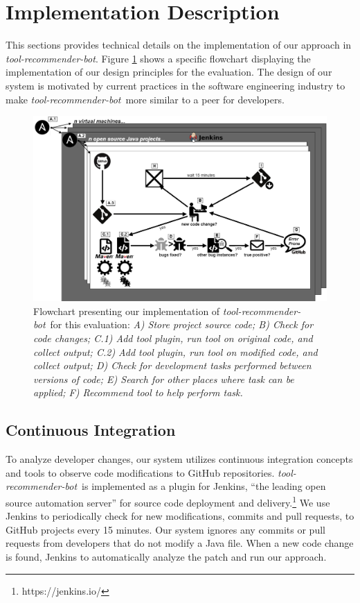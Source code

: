 \documentclass[sigconf,review,anonymous]{acmart}
\newcommand{\tool}{\textsl{tool-recommender-bot}}
\begin{document}
\section{Implementation Description}

This sections provides technical details on the implementation of our approach in \tool. Figure \ref{fig:chartB} shows a specific flowchart displaying the implementation of our design principles for the evaluation. The design of our system is motivated by current practices in the software engineering industry to make \tool~more similar to a peer for developers.

\begin{figure}
	\includegraphics[width=\textwidth]{images/flowchartB.png}
	\caption{Flowchart presenting our implementation of \tool~for this evaluation: \textit{A) Store project source code; B) Check for code changes; C.1) Add tool plugin, run tool on original code, and collect output; C.2) Add tool plugin, run tool on modified code, and collect output; D) Check for development tasks performed between versions of code; E) Search for other places where task can be applied; F) Recommend tool to help perform task.}}	
	\label{fig:chartB} 
\end{figure}

\subsection{Continuous Integration}

To analyze developer changes, our system utilizes continuous integration concepts and tools to observe code modifications to GitHub repositories. \tool~is implemented as a plugin for Jenkins, ``the leading open source automation server'' for source code deployment and delivery.\footnote{https://jenkins.io/} We use Jenkins to periodically check for new modifications, commits and pull requests, to GitHub projects every 15 minutes. Our system ignores any commits or pull requests from developers that do not modify a Java file.
When a new code change is found, Jenkins to automatically analyze the patch and run our approach. 
\end{document}
